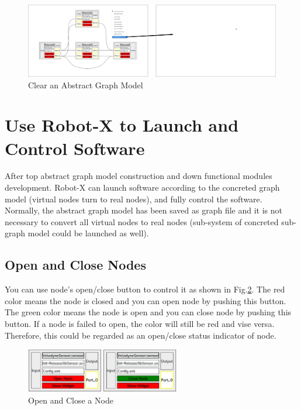 \documentclass[a4paper,10pt]{book}
\begin{document}
\begin{figure}
 \centering
 \includegraphics[width=1.0\textwidth]{img/cleargraph.eps}
 \caption{Clear an Abstract Graph Model}
 \label{fig:cleargraph}
\end{figure}

\section{Use Robot-X to Launch and Control Software}

After top abstract graph model construction and down functional modules development. Robot-X can launch software according to the concreted graph model (virtual nodes turn to real nodes), and fully control the software. Normally, the abstract graph model has been saved as graph file and it is not necessary to convert all virtual nodes to real nodes (sub-system of concreted sub-graph model could be launched as well).

\subsection{Open and Close Nodes}

You can use node's open/close button to control it as shown in Fig.\ref{fig:openclose}. The red color means the node is closed and you can open node by pushing this button. The green color means the node is open and you can close node by pushing this button. If a node is failed to open, the color will still be red and vise versa. Therefore, this could be regarded as an open/close status indicator of node.

\begin{figure}
 \centering
 \includegraphics[width=0.6\textwidth]{img/openclose.eps}
 \caption{Open and Close a Node}
 \label{fig:openclose}
\end{figure}
\end{document}
